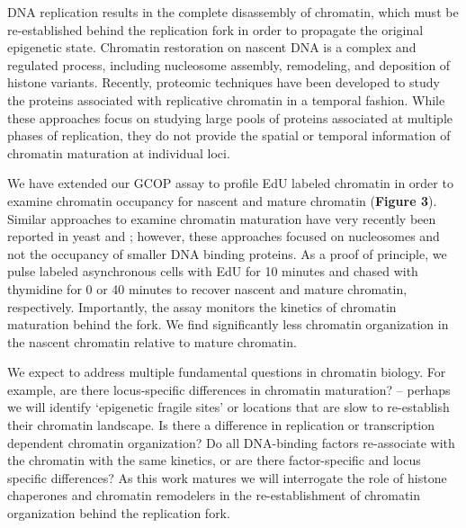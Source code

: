 DNA replication results in the complete disassembly of chromatin, which must be re-established behind the replication fork in order to propagate the original epigenetic state. Chromatin restoration on nascent DNA is a complex and regulated process, including nucleosome assembly, remodeling, and deposition of histone variants\citep{MacAlpine2013-ds}.  Recently, proteomic techniques have been developed to study the proteins associated with replicative chromatin in a temporal fashion\citep{Alabert2014-io,Sirbu2011-wx}. %
While these approaches focus on studying large pools of proteins associated at multiple phases of replication, they do not provide the spatial or temporal information of chromatin maturation at individual loci. 

We have extended our GCOP assay to profile EdU labeled chromatin in order to examine chromatin occupancy for nascent and mature chromatin ({\color{dukeblue}\textbf{Figure 3}}).  Similar approaches to examine chromatin maturation have very recently been reported in yeast\citep{Vasseur2016-rx} and \dros\citep{Ramachandran2016-zu}; however, these approaches focused on nucleosomes and not the occupancy of smaller DNA binding proteins.  As a proof of principle, we pulse labeled asynchronous cells with EdU for 10 minutes and chased with thymidine for 0 or 40 minutes to recover nascent and mature chromatin, respectively.  Importantly, the  assay monitors the kinetics of chromatin maturation behind the fork. We find significantly less chromatin organization in the nascent chromatin relative to mature chromatin. %

We expect to address multiple fundamental questions in chromatin biology. For example, are there locus-specific differences in chromatin maturation? -- perhaps we will identify `epigenetic fragile sites' or locations that are slow to re-establish their chromatin landscape. Is there a difference in replication or transcription dependent chromatin organization? Do all DNA-binding factors re-associate with the chromatin with the same kinetics, or are there factor-specific and locus specific differences?   As this work matures we will interrogate the role of histone chaperones and chromatin remodelers in the re-establishment of chromatin organization behind the replication fork.  

